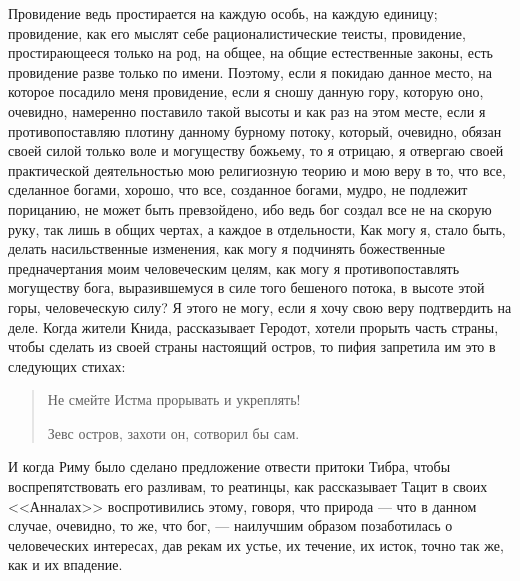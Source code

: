 \documentclass[12pt]{article}
\begin{document}
Провидение ведь простирается на каждую особь, на каждую единицу; провидение, как его мыслят себе рационалистические теисты, провидение, простирающееся только на род, на общее, на общие естественные законы, есть провидение разве только по имени. Поэтому, если я покидаю данное место, на которое посадило меня провидение, если я сношу данную гору, которую оно, очевидно, намеренно поставило такой высоты и как раз на этом месте, если я противопоставляю плотину данному бурному потоку, который, очевидно, обязан своей силой только воле и могуществу божьему, то я отрицаю, я отвергаю своей практической деятельностью мою религиозную теорию и мою веру в то, что все, сделанное богами, хорошо, что все, созданное богами, мудро, не подлежит порицанию, не может быть превзойдено, ибо ведь бог создал все не на скорую руку, так лишь в общих чертах, а каждое в отдельности, Как могу я, стало быть, делать насильственные изменения, как могу я подчинять божественные предначертания моим человеческим целям, как могу я противопоставлять могуществу бога, выразившемуся в силе того бешеного потока, в высоте этой горы, человеческую силу? Я этого не могу, если я хочу свою веру подтвердить на деле. Когда жители Книда, рассказывает Геродот, хотели прорыть часть страны, чтобы сделать из своей страны настоящий остров, то пифия запретила им это в следующих стихах: 
\begin{quote}
    

Не смейте Истма прорывать и укреплять! 

Зевс остров, захоти он, сотворил бы сам.

\end{quote}

И когда Риму было сделано предложение отвести притоки Тибра, чтобы воспрепятствовать его разливам, то реатинцы, как рассказывает Тацит в своих <<Анналах>>  воспротивились этому, говоря, что природа --- что в данном случае, очевидно, то же, что бог, --- наилучшим образом позаботилась о человеческих интересах, дав рекам их устье, их течение, их исток, точно так же, как и их впадение. 
\end{document}
